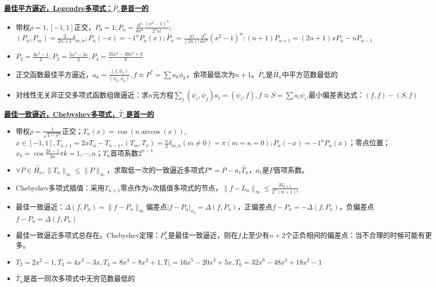 \documentclass[UTF8,a4paper,landscape,compress]{paper}
\renewcommand{\subsection}[1]{{\small\textbf{\underline{#1}}}\\ }
\newcommand{\List}[1]{\begin{itemize}[fullwidth,itemindent=0em] #1 \end{itemize}}
\begin{document}
\begin{multicols}{4}
    \subsection{最佳平方逼近，Legendre多项式：$\widetilde {P_n}$是首一的}
    \List{
        \item {带权$\rho = 1,[-1,1]$正交，$P_0=1;P_n=\frac{\mathrm d^n}{\mathrm dx^n} \frac{(x^2-1)^n}{2^nn!};$ \\ $ (P_n,P_m) = \frac{2}{2n+1}\delta_{m,n}; P_n(-x) = -1^nP_n(x); \widetilde {P_n} = \frac{n!}{(2n)!}\frac{\mathrm d^n}{\mathrm dx^n}(x^2-1)^n; (n+1)P_{n+1} = (2n+1)xP_n - nP_{n-1}$}
        \item {$P_2 = \frac{3x^2-1}{2},P_3 = \frac{5x^3-3x}{2},P_4=\frac{35x^4-30x^2+3}{8}$}
        \item {正交函数最佳平方逼近，$a_k=\frac{(f,\phi_k)}{(\phi_k,\phi_k)},f\approx P^* = \sum a_k\phi_k$，余项最低次为$n+1$。$\widetilde {P_n}$是$\widetilde {H_n}$中平方范数最低的}
        \item {对线性无关非正交多项式函数组做逼近：求$n$元方程$\sum_j(\psi_i,\psi_j)a_j = (\psi_i,f), f \approx S = \sum a_i\psi_i$,最小偏差表达式：$(f,f) - (S,f)$}
    }
    \subsection{最佳一致逼近，Chebyshev多项式，$\widetilde{T_n}$是首一的}
    \List{
        \item {带权$\rho = \frac{1}{\sqrt{1-x^2}}$正交；$T_n(x) = \cos(n\arccos(x))$,$x \in[-1,1],T_{n+1} = 2xT_n -T_{n-1},(T_m,T_n) = \frac{\pi}{2}\delta_{m,n}(m \ne 0) = \pi (m = n = 0);P_n(-x) = -1^nP_n(x)$；零点位置；$x_k = \cos\frac{2k-1}{2n}\pi k = 1,\cdots,n$；$T_n$首项系数$2^{n-1}$}
        \item {$\forall P\in\widetilde{H_n},\|T_n\|_\infty\le \|P\|_\infty$，求取低一次的一致逼近多项式$P* = P - a_1\widetilde{T_n}$，$a_1$是$P$首项系数。}
        \item {Chebyshev多项式插值：采用$T_{n+1}$零点作为$n$次插值多项式的节点，$\|f-L_n\|_\infty \le \frac{M_{n+1}}{2^n(n+1)!}$}
        \item {最佳一致逼近：$\Delta(f,P_n) = \|f-P_n\|_\infty$偏差点$|f-P_n|_{x_0} = \Delta(f,P_n)$，正偏差点$f-P_n = -\Delta(f,P_n)$，负偏差点$f-P_n = \Delta(f,P_n)$}
        \item {最佳一致逼近多项式总存在。Chebyshev定理：$P^*_n$是最佳一致逼近，则在$f$上至少有$n+2$个正负相间的偏差点：当不合理的时候可能有更多。}
        \item {$T_2 = 2x^2-1,T_3 = 4x^3 -3x, T_4 = 8x^4 - 8x^2 + 1,T_5 = 16x^5-20x^3+5x,T_6 = 32x^6-48x^4+18x^2-1$ }
        \item {$\widetilde{T_n}$是首一同次多项式中无穷范数最低的}
    }

\end{multicols}
\end{document}
